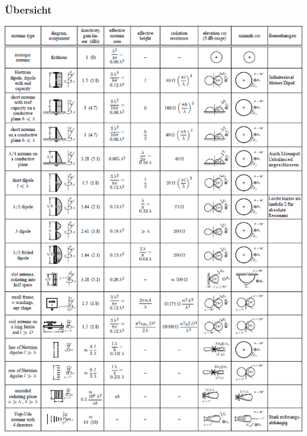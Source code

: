 \subsubsection{Übersicht }
\includegraphics[angle=90,width=19cm]{./bilder/antennas-overview.png}

%    
%    
%    
%    


